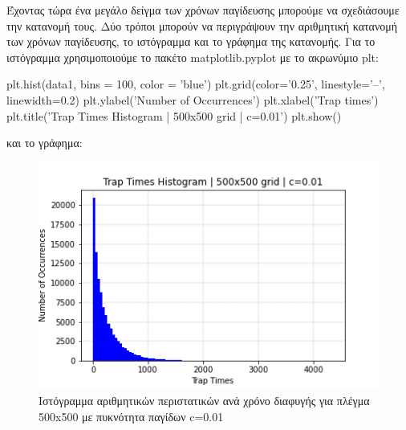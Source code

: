 Έχοντας τώρα ένα μεγάλο δείγμα των χρόνων παγίδευσης μπορούμε να σχεδιάσουμε την κατανομή τους. Δύο τρόποι μπορούν να περιγράψουν την αριθμητική κατανομή των χρόνων παγίδευσης, το ιστόγραμμα και το γράφημα της κατανομής. 
Για το ιστόγραμμα χρησιμοποιούμε το πακέτο {\en matplotlib.pyplot} με το ακρωνύμιο {\en plt}:
\en 
\begin{python}
plt.hist(data1, bins = 100, color = 'blue')
plt.grid(color='0.25', linestyle='--', linewidth=0.2)
plt.ylabel('Number of Occurrences')
plt.xlabel('Trap times')
plt.title('Trap Times Histogram | 500x500 grid | c=0.01')
plt.show()
\end{python}
\gr και το γράφημα:
\begin{figure}[H]
\begin{center}
\includegraphics[scale=0.7]{figures/TRW_001_hist.png}
\caption{Ιστόγραμμα αριθμητικών περιστατικών ανά χρόνο διαφυγής για πλέγμα 500{\en x}500 με πυκνότητα παγίδων {\en c}=0.01}
\label{figuridion3d}
\end{center}
\end{figure}

